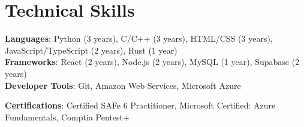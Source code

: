 \documentclass[letterpaper,11pt]{article}
\newcommand{\resumeSubHeadingListStart}{\begin{itemize}[leftmargin=0.0in, label={}]}
\newcommand{\resumeSubHeadingListEnd}{\end{itemize}}
\begin{document}
  \section{Technical Skills}
 \begin{itemize}[leftmargin=0.15in, label={}]
    \small{\item{
     \textbf{Languages}{: Python (3 years), C/C++ (3 years), HTML/CSS (3 years), JavaScript/TypeScript (2 years), Rust (1 year)} \\
    \textbf{Frameworks}{: React (2 years), Node.js (2 years), MySQL (1 year), Supabase (2 years)} \\
     \textbf{Developer Tools}{: Git, Amazon Web Services, Microsoft Azure} \\
     \begin{comment} 
    \textbf{Offensive/Defensive Security Tools}{: Metasploit, Burp Suite, Nmap, Wireshark, Ghidra, GDB+GEF, Radare2} \\
    \end{comment}  
    \textbf{Certifications}{: Certified SAFe 6 Practitioner, Microsoft Certified: Azure Fundamentals, Comptia Pentest+} \\
    }}
 \end{itemize}
 \vspace{-16pt}

\begin{comment}
\section{Relevant Coursework}
        \begin{multicols}{4}
            \begin{itemize}[itemsep=-5pt, parsep=3pt]
                \item\small Data Structures
                \item Software Methodology
                \item Algorithms Analysis
                \item Database Management
                \item Artificial Intelligence
                \item Internet Technology
                \item Systems Programming
                \item Computer Architecture
            \end{itemize}
        \end{multicols}
        \vspace*{2.0\multicolsep}
\end{comment}
 
\end{document}
